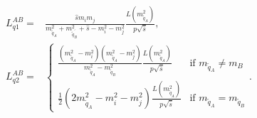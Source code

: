 \documentclass[../main.tex]{subfiles}
\begin{document}
\begin{align}
  L_{q1}^{AB} = & \frac{\hat{s} m_i m_j}{m_{\tilde{q}_A}^2 + m_{\tilde{q}^\prime_B}^2 + \hat{s} - m_i^2 - m_j^2} \frac{L(m_{\tilde{q}_A}^2)}{p \sqrt{\hat{s}}},                                                                                                                                                                                                                                                                                                                                                                                      \\
  L_{q2}^{AB} = & \begin{cases}\frac{(m_{\tilde{q}_A}^2-m_i^2)(m_{\tilde{q}_A}^2-m_j^2)}{m_{\tilde{q}_A}^2-m_{\tilde{q}_B}^2} \frac{L(m_{\tilde{q}_A}^2)}{p \sqrt{\hat{s}}} & \text{if } m_{\tilde{q}_A} \neq m_B \\ \frac{1}{2}(2 m_{\tilde{q}_A}^2 - m_i^2 - m_j^2) \frac{L(m_{\tilde{q}_A}^2)}{p \sqrt{\hat{s}}} & \text{if } m_{\tilde{q}_A} = m_{\tilde{q}_B} \end{cases}.
\end{align}
\end{document}
